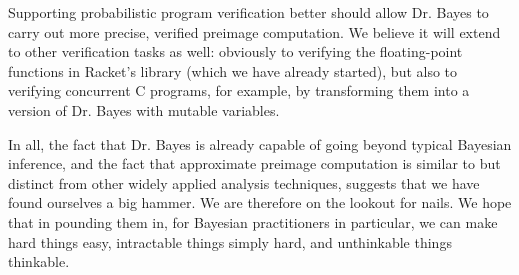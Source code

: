 Supporting probabilistic program verification better should allow Dr. Bayes to carry out more precise, verified preimage computation.
We believe it will extend to other verification tasks as well: obviously to verifying the floating-point functions in Racket's  library (which we have already started), but also to verifying concurrent C programs, for example, by transforming them into a version of Dr. Bayes with mutable variables.

In all, the fact that Dr. Bayes is already capable of going beyond typical Bayesian inference, and the fact that approximate preimage computation is similar to but distinct from other widely applied analysis techniques, suggests that we have found ourselves a big hammer.
We are therefore on the lookout for nails.
We hope that in pounding them in, for Bayesian practitioners in particular, we can make hard things easy, intractable things simply hard, and unthinkable things thinkable.

